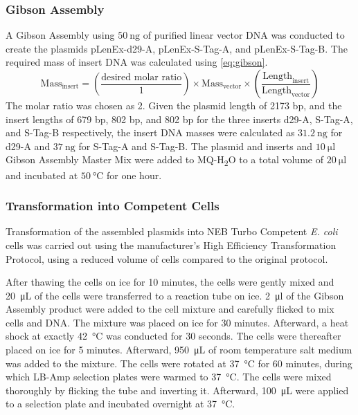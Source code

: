 \subsubsection{Gibson Assembly}
A Gibson Assembly using $\SI{50}{\nano\gram}$ of purified linear vector DNA was conducted to create the plasmids pLenEx-d29-A, pLenEx-S-Tag-A, and pLenEx-S-Tag-B. The required mass of insert DNA was calculated using \autoref{eq:gibson}.
\begin{equation}\label{eq:gibson}
\text{Mass}_{\text{insert}} = \left(\frac{\text{desired molar ratio}}{1}\right) \times \text{Mass}_{\text{vector}} \times \left(\frac{\text{Length}_{\text{insert}}}{\text{Length}_{\text{vector}}}\right)
\end{equation}
The molar ratio was chosen as 2. 
Given the plasmid length of 2173 bp, and the insert lengths of 679 bp, 802 bp, and 802 bp for the three inserts d29-A, S-Tag-A, and S-Tag-B respectively, the insert DNA masses were calculated as $\SI{31.2}{\nano\gram}$ for d29-A and $\SI{37}{\nano\gram}$ for S-Tag-A and S-Tag-B. 
The plasmid and inserts and $\SI{10}{\micro\litre}$ Gibson Assembly\textsuperscript{\textregistered} Master Mix were added to MQ-H\textsubscript{2}O to a total volume of $\SI{20}{\micro\litre}$ and incubated at $\SI{50}{\degreeCelsius}$ for one hour. 

\subsubsection{Transformation into Competent Cells}
Transformation of the assembled plasmids into NEB\textsuperscript{\textregistered} Turbo Competent \emph{E. coli} cells was carried out using the manufacturer's High Efficiency Transformation Protocol, using a reduced volume of cells compared to the original protocol.

After thawing the cells on ice for 10 minutes, the cells were gently mixed and \SI{20}{\micro\liter} of the cells were transferred to a reaction tube on ice. \SI{2}{\micro\litre} of the Gibson Assembly product were added to the cell mixture and carefully flicked to mix cells and DNA. The mixture was placed on ice for 30 minutes. Afterward, a heat shock at exactly \SI{42}{\celsius} was conducted for 30 seconds. The cells were thereafter placed on ice for 5 minutes. Afterward, \SI{950}{\micro\liter} of room temperature salt medium was added to the mixture. The cells were rotated at \SI{37}{\celsius} for 60 minutes, during which LB-Amp selection plates were warmed to \SI{37}{\celsius}. The cells were mixed thoroughly by flicking the tube and inverting it. Afterward, \SI{100}{\micro\liter} were applied to a selection plate and incubated overnight at \SI{37}{\celsius}.

